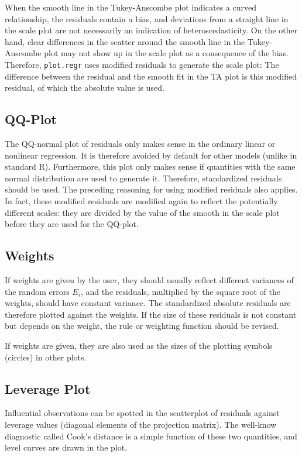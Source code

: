 \documentclass{article}
\providecommand{\T}{\texttt}
\begin{document}
When the smooth line in the Tukey-Anscombe plot indicates a curved
relationship, the residuals contain a bias, and deviations from a straight
line in the scale plot are not necessarily an indication of
heteroscedasticity. On the other hand, clear differences in the scatter
around the smooth line in the Tukey-Anscombe plot may not show up in 
the scale plot as a consequence of the bias.
Therefore, \T{plot.regr} uses modified residuals to generate the scale
plot: The difference between the residual and the smooth fit in the
TA plot is this modified residual, of which the absolute value is used.

\subsection{QQ-Plot}
The QQ-normal plot of residuals only makes sense in the ordinary linear or
nonlinear regression. It is therefore avoided by default for other models 
(unlike in standard R).
Furthermore, this plot only makes sense if quantities with the same normal
distribution are used to generate it. 
Therefore, standardized residuals should be used.
The preceding reasoning for using modified residuals also applies.
In fact, these modified residuals are modified again to reflect the
potentially different scales: they are divided by the value of the smooth
in the scale plot before they are used for the QQ-plot.

\subsection{Weights}
If weights are given by the user, they should usually reflect different
variances of the random errors $E_i$, and the residuals, multiplied by the
square root of the weights, should have constant variance.
The standardized absolute residuals are therefore plotted against the weights.
If the size of these residuals is not constant but depends on the weight, 
the rule or weighting function should be revised.

If weights are given, they are also used as the sizes of the plotting
symbols (circles) in other plots.

\subsection{Leverage Plot}
Influential observations can be spotted in the scatterplot of residuals
against leverage values (diagonal elements of the projection matrix).
The well-know diagnostic called Cook's distance is a simple function of
these two quantities, and level curves are drawn in the plot.
\end{document}
